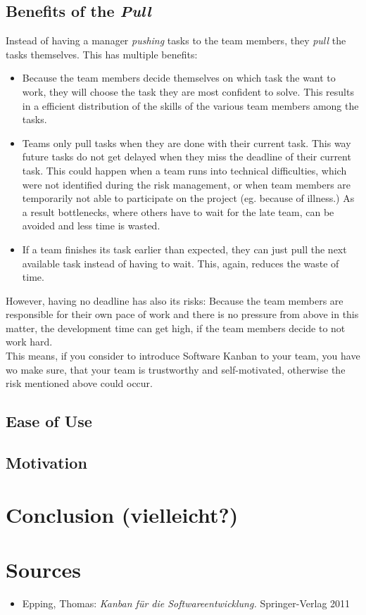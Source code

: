\documentclass[12pt]{scrartcl}
\newcommand{\bi}{\begin{itemize}}
\newcommand{\ei}{\end{itemize}}
\begin{document}
		\subsection{Benefits of the \textit{Pull}} 
			Instead of having a manager \textit{pushing} tasks to the team members, they \textit{pull} the tasks themselves. This has multiple benefits:
			
			\bi
				\item Because the team members decide themselves on which task the want to work, they will choose the task they are most confident to solve. This results in a efficient distribution of the skills of the various team members {\color{red} among} the tasks.
				\item Teams only pull tasks when they are done with their current task. This way future tasks do not get delayed when they miss the deadline of their current task. This could happen when a team runs into technical difficulties, which were not identified during the risk management, or when team members are temporarily not able to participate on the project (eg. because of illness.) As a result bottlenecks, where others have to wait for the late team, can be avoided and less time is wasted.
				\item If a team finishes its task earlier than expected, they can just pull the next available task instead of having to wait. This, again, reduces the waste of time.
						
			\ei
			
			However, having no deadline has also its risks: Because the team members are responsible for their own pace of work and there is no pressure from above in this matter, the development time can get high, if the team members decide to not work hard. \\
			
			This means, if you consider to introduce Software Kanban to your team, you have wo make sure, that your team is trustworthy and self-motivated, otherwise the risk mentioned above could occur.
			
		\subsection{Ease of Use}
		
		\subsection{Motivation}
		
		
	\newpage
			
	\section{\color{red}Conclusion (vielleicht?)}
		
	\section{Sources}
		\bi
			\item Epping, Thomas: \textit{Kanban für die Softwareentwicklung.} Springer-Verlag 2011
				
		\ei
		
\end{document}
